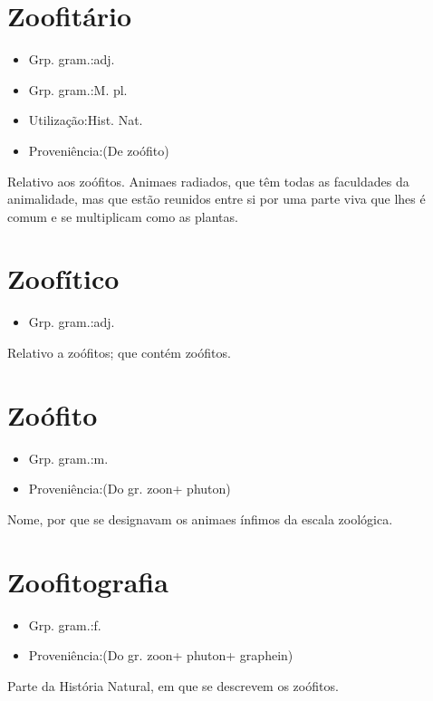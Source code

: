 \section{Zoofitário}
\begin{itemize}
\item {Grp. gram.:adj.}
\end{itemize}
\begin{itemize}
\item {Grp. gram.:M. pl.}
\end{itemize}
\begin{itemize}
\item {Utilização:Hist. Nat.}
\end{itemize}
\begin{itemize}
\item {Proveniência:(De \textunderscore zoófito\textunderscore )}
\end{itemize}
Relativo aos zoófitos.
Animaes radiados, que têm todas as faculdades da animalidade, mas que estão reunidos entre si por uma parte viva que lhes é comum e se multiplicam como as plantas.
\section{Zoofítico}
\begin{itemize}
\item {Grp. gram.:adj.}
\end{itemize}
Relativo a zoófitos; que contém zoófitos.
\section{Zoófito}
\begin{itemize}
\item {Grp. gram.:m.}
\end{itemize}
\begin{itemize}
\item {Proveniência:(Do gr. \textunderscore zoon\textunderscore  + \textunderscore phuton\textunderscore )}
\end{itemize}
Nome, por que se designavam os animaes ínfimos da escala zoológica.
\section{Zoofitografia}
\begin{itemize}
\item {Grp. gram.:f.}
\end{itemize}
\begin{itemize}
\item {Proveniência:(Do gr. \textunderscore zoon\textunderscore  + \textunderscore phuton\textunderscore  + \textunderscore graphein\textunderscore )}
\end{itemize}
Parte da História Natural, em que se descrevem os zoófitos.

